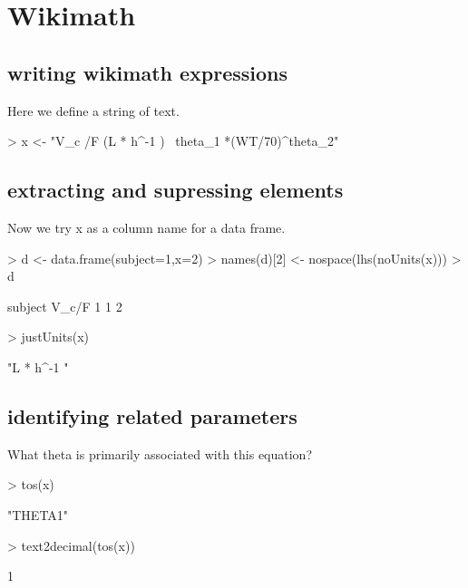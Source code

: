 \documentclass[titlepage]{article}
\begin{document}
\section*{Wikimath}
\subsection{writing wikimath expressions}
Here we define a string of text.
\begin{Schunk}
\begin{Sinput}
> x <- "V_c /F (L * h^-1 ) ~theta_1 *(WT/70)^theta_2"
\end{Sinput}
\end{Schunk}
\subsection{extracting and supressing elements}
Now we try x as a column name for a data frame.
\begin{Schunk}
\begin{Sinput}
> d <- data.frame(subject=1,x=2)
> names(d)[2] <- nospace(lhs(noUnits(x)))
> d
\end{Sinput}
\begin{Soutput}
  subject V_c/F
1       1     2
\end{Soutput}
\begin{Sinput}
> justUnits(x)
\end{Sinput}
\begin{Soutput}
[1] "L * h^-1 "
\end{Soutput}
\end{Schunk}
\subsection{identifying related parameters}
What theta is primarily associated with this equation?
\begin{Schunk}
\begin{Sinput}
> tos(x)
\end{Sinput}
\begin{Soutput}
[1] "THETA1"
\end{Soutput}
\begin{Sinput}
> text2decimal(tos(x))
\end{Sinput}
\begin{Soutput}
[1] 1
\end{Soutput}
\end{Schunk}
\end{document}

